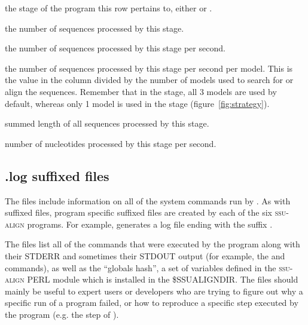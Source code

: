 \begin{wideitem}
\item[\emprog{stage}] the stage of the program this row pertains to,
  either  or .

\item[\emprog{num seqs}] the number of sequences processed by this stage.

\item[\emprog{seq/sec}] the number of sequences processed by this
  stage per second.

\item[\emprog{seq/sec/model}] the number of sequences processed by this
  stage per second per model. This is the value in the 
  column divided by the number of models used to search for or align
  the sequences. Remember that in the  stage, all 3
  models are used by default, whereas only 1 model is used in the
   stage (figure~\ref{fig:strategy}).

\item[\emprog{nucleotides}] summed length of all sequences processed
  by this stage.

\item[\emprog{nt/sec}] number of nucleotides processed by this stage
  per second.
\end{wideitem}

\subsection{.log suffixed files}

The  files include information on all of the system
commands run by . As with  suffixed files,
program specific  suffixed files are created by each of the
six \textsc{ssu-align} programs. For example, 
generates a log file ending with the suffix .

The  files list all of the commands that were executed by
the program along with their STDERR and sometimes their STDOUT output
(for example, the  and  commands), as
well as the ``globals hash'', a set of variables defined in the
\textsc{ssu-align} PERL module  which is installed in the
\$SSUALIGNDIR. The  files should mainly be useful to expert 
users or developers who are trying to figure out why a specific run of a
program failed, or how to reproduce a specific step executed by the
program (e.g. the  step of ).

